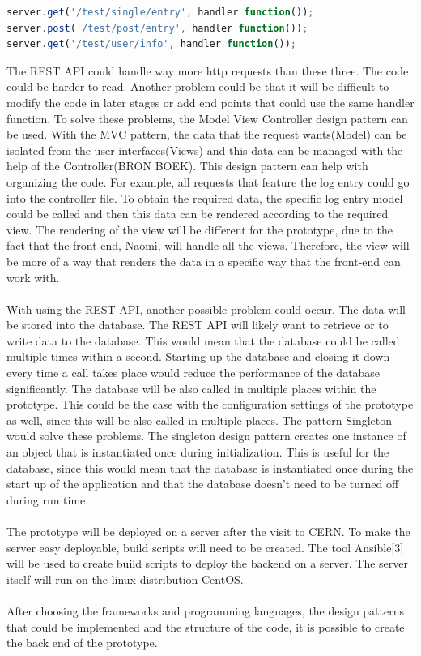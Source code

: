\documentclass[paper=a4, fontsize=11pt,twoside]{scrartcl}	%
\begin{document}
\begin{lstlisting}[language=JavaScript, frame=single]
server.get('/test/single/entry', handler function());
server.post('/test/post/entry', handler function());
server.get('/test/user/info', handler function());
\end{lstlisting} 
The REST API could handle way more http requests than these three. The code could be harder to read. Another problem could be that it will be difficult to modify the code in later stages or add end points that could use the same handler function. To solve these problems, the Model View Controller design pattern can be used. With the MVC pattern, the data that the request wants(Model) can be isolated from the user interfaces(Views) and this data can be managed with the help of the Controller(BRON BOEK). This design pattern can help with organizing the code. For example, all requests that feature the log entry could go into the controller file. To obtain the required data, the specific log entry model could be called and then this data can be rendered according to the required view. The rendering of the view will be different for the prototype, due to the fact that the front-end, Naomi, will handle all the views. Therefore, the view will be more of a way that renders the data in a specific way that the front-end can work with.\\ \\
With using the REST API, another possible problem could occur. The data will be stored into the database. The REST API will likely want to retrieve or to write data to the database. This would mean that the database could be called multiple times within a second. Starting up the database and closing it down every time a call takes place would reduce the performance of the database significantly. The database will be also called in multiple places within the prototype. This could be the case with the configuration settings of the prototype as well, since this will be also called in multiple places. The pattern Singleton would solve these problems. The singleton design pattern creates one instance of an object that is instantiated once during initialization. This is useful for the database, since this would mean that the database is instantiated once during the start up of the application and that the database doesn't need to be turned off during run time. \\ \\
The prototype will be deployed on a server after the visit to CERN. To make the server easy deployable, build scripts will need to be created. The tool Ansible[3] will be used to create build scripts to deploy the backend on a server. The server itself will run on the linux distribution CentOS.   \\ \\
After choosing the frameworks and programming languages, the design patterns that could be implemented and the structure of the code, it is possible to create the back end of the prototype.   
\end{document}
